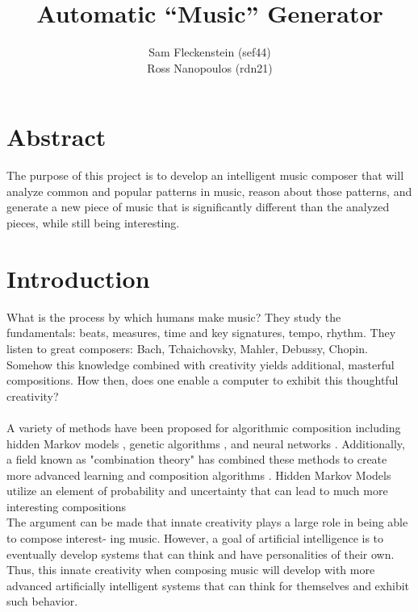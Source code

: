 \documentclass{article}
\begin{document}
\clearpage
{}
\begin{center}
\begin{minipage}{.6\textwidth}

\title{Automatic ``Music'' Generator \\ \vspace{2 pt} }
\author{Sam Fleckenstein (sef44) \\ Ross Nanopoulos (rdn21)}
\maketitle

\end{minipage}
\end{center}
\clearpage

\tableofcontents
\newpage

\section{Abstract}
The purpose of this project is to develop an intelligent music composer that will analyze common and popular patterns in music, reason about those patterns, and generate a new piece of music that is significantly different than the analyzed pieces, while still being interesting.

\newpage

\section{Introduction}
What is the process by which humans make music? They study the fundamentals: beats, measures, time and key signatures, tempo, rhythm. They listen to great composers: Bach, Tchaichovsky, Mahler, Debussy, Chopin. Somehow this knowledge combined with creativity yields additional, masterful compositions. How then, does one enable a computer to exhibit this thoughtful creativity?\\
\\
A variety of methods have been proposed for algorithmic composition including hidden Markov models \cite{5492670}, genetic algorithms \cite{514161}, and neural networks \cite{4667040}. Additionally, a field known as "combination theory" has combined these methods to create more advanced learning and composition algorithms \cite{4626654}. Hidden Markov Models utilize an element of probability and uncertainty that can lead to much more interesting compositions
\\
The argument can be made that innate creativity plays a large role in being able to compose interest- ing music. However, a goal of artificial intelligence is to eventually develop systems that can think and have personalities of their own. Thus, this innate creativity when composing music will develop with more advanced artificially intelligent systems that can think for themselves and exhibit such behavior.
\end{document}
